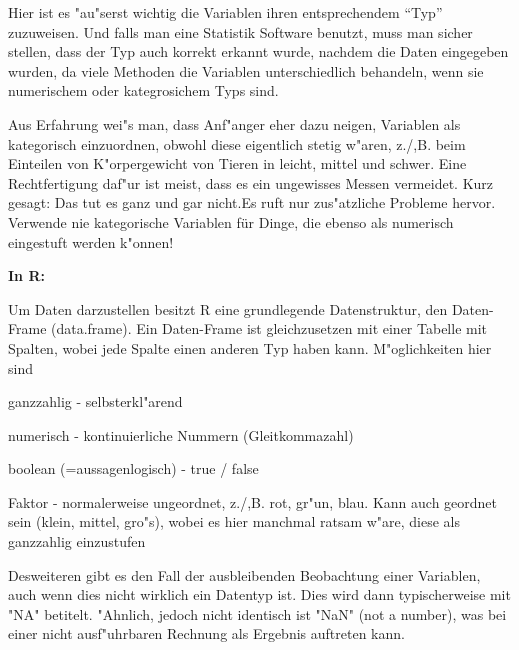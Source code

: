 \documentclass[a4paper,twoside]{tufte-book}\usepackage[]{graphicx}\usepackage[]{color}
\begin{document}
{Hier ist es "au"serst wichtig die Variablen ihren entsprechendem ``Typ'' zuzuweisen. Und falls man eine Statistik Software benutzt, muss man sicher stellen, dass der Typ auch korrekt erkannt wurde, nachdem die Daten eingegeben wurden, da viele Methoden die Variablen unterschiedlich behandeln, wenn sie numerischem oder kategrosichem Typs sind.

Aus Erfahrung wei"s man, dass Anf"anger eher dazu neigen, Variablen als kategorisch einzuordnen, obwohl diese eigentlich stetig w"aren, z./,B. beim Einteilen von K"orpergewicht von Tieren in leicht, mittel und schwer. Eine Rechtfertigung daf"ur ist meist, dass es ein ungewisses Messen vermeidet. Kurz gesagt: Das tut es ganz und gar nicht.Es ruft nur zus"atzliche Probleme hervor. Verwende nie kategorische Variablen für Dinge, die ebenso als numerisch eingestuft werden k"onnen!


\vspace{1cm}
\begin{fullwidth}
\begin{mdframed}
    
\textbf{In R:} 

Um Daten darzustellen besitzt R eine grundlegende Datenstruktur, den Daten-Frame (data.frame). Ein Daten-Frame ist gleichzusetzen mit einer Tabelle mit Spalten, wobei jede Spalte einen anderen Typ haben kann. M"oglichkeiten hier sind

\begin{itemize*}
  \item ganzzahlig - selbsterkl"arend
  \item numerisch - kontinuierliche Nummern (Gleitkommazahl)
  \item boolean (=aussagenlogisch) - true / false
  \item Faktor - normalerweise ungeordnet, z./,B. rot, gr"un, blau. Kann auch geordnet sein (klein, mittel, gro"s), wobei es hier manchmal ratsam w"are, diese als ganzzahlig einzustufen
\end{itemize*}

Desweiteren gibt es den Fall der ausbleibenden Beobachtung einer Variablen, auch wenn dies nicht wirklich ein Datentyp ist. Dies wird dann typischerweise mit "NA" betitelt. "Ahnlich, jedoch nicht identisch ist "NaN" (not a number), was bei einer nicht ausf"uhrbaren Rechnung als Ergebnis auftreten kann.


\end{mdframed}
\end{fullwidth}}
\end{document}
